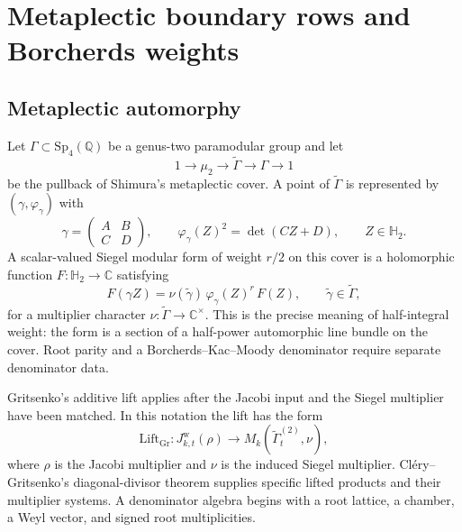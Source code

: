 \providecommand{\Sp}{\mathrm{Sp}}
\providecommand{\Mp}{\mathrm{Mp}}
\providecommand{\Z}{\mathbb{Z}}
\providecommand{\Q}{\mathbb{Q}}
\providecommand{\R}{\mathbb{R}}
\providecommand{\C}{\mathbb{C}}
\providecommand{\HH}{\mathbb{H}}
\providecommand{\kBKM}{\kappa_{\mathrm{BKM}}}
\providecommand{\kch}{\kappa_{\mathrm{ch}}}
\providecommand{\kcat}{\kappa_{\mathrm{cat}}}
\providecommand{\kfib}{\kappa_{\mathrm{fiber}}}
\providecommand{\kHeis}{\kappa_{\mathrm{ch}}^{\mathrm{Heis}}}
\providecommand{\fg}{\mathfrak{g}}
\providecommand{\wt}{\mathrm{wt}}
\providecommand{\Lift}{\mathrm{Lift}}
\providecommand{\Dfive}{D_5}
\providecommand{\cO}{\mathcal{O}}

\section{Metaplectic boundary rows and Borcherds weights}
\label{sec:metaplectic-boundary-weights}

\subsection*{Metaplectic automorphy}

Let $\Gamma \subset \Sp_4(\Q)$ be a genus-two paramodular group and let
\[
  1 \longrightarrow \mu_2 \longrightarrow \widetilde{\Gamma}
  \longrightarrow \Gamma \longrightarrow 1
\]
be the pullback of Shimura's metaplectic cover.  A point of
$\widetilde{\Gamma}$ is represented by
$(\gamma,\varphi_\gamma)$ with
\[
  \gamma=\begin{pmatrix}A&B\\ C&D\end{pmatrix},\qquad
  \varphi_\gamma(Z)^2=\det(CZ+D),\qquad Z\in \HH_2 .
\]
A scalar-valued Siegel modular form of weight $r/2$ on this cover is a
holomorphic function $F\colon\HH_2\to\C$ satisfying
\[
  F(\gamma Z)=\nu(\widetilde{\gamma})\,
  \varphi_\gamma(Z)^r\,F(Z),
  \qquad \widetilde{\gamma}\in\widetilde{\Gamma},
\]
for a multiplier character $\nu\colon\widetilde{\Gamma}\to\C^\times$.
This is the precise meaning of half-integral weight: the form is a
section of a half-power automorphic line bundle on the cover.  Root
parity and a Borcherds--Kac--Moody denominator require separate
denominator data.

Gritsenko's additive lift applies after the Jacobi input and the Siegel
multiplier have been matched.  In this notation the lift has the form
\[
  \Lift_{\mathrm{Gr}}\colon
  J^{\mathrm w}_{k,t}(\rho)
  \longrightarrow
  M_k(\widetilde{\Gamma}^{(2)}_t,\nu),
\]
where $\rho$ is the Jacobi multiplier and $\nu$ is the induced Siegel
multiplier.  Cl\'ery--Gritsenko's diagonal-divisor theorem supplies
specific lifted products and their multiplier systems.  A denominator
algebra begins with a root lattice, a chamber, a Weyl vector, and signed
root multiplicities.

